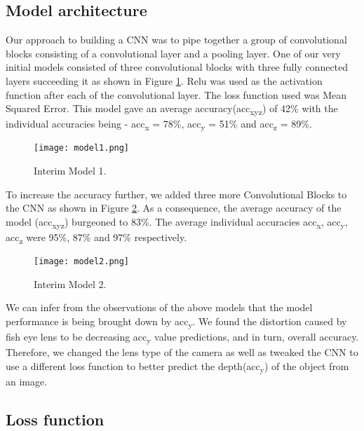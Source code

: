 \documentclass{article}
\begin{document}
\subsection{Model architecture}
Our approach to building a CNN was to pipe together a group of convolutional blocks consisting of a convolutional layer and a pooling layer. One of our very initial models consisted of three convolutional blocks with three fully connected layers succeeding it as shown in Figure \ref{fig:model1}. Relu was used as the activation function after each of the convolutional layer. The loss function used was Mean Squared Error. This model gave an average accuracy(acc\textsubscript{xyz}) of 42\% with the individual accuracies being - acc\textsubscript{x} = 78\%, acc\textsubscript{y} = 51\% and acc\textsubscript{z} = 89\%.

\begin{figure}[ht]
  \centering
  \texttt{[image: model1.png]}
  \caption{Interim Model 1.}
  \label{fig:model1}
\end{figure}

To increase the accuracy further, we added three more Convolutional Blocks to the CNN as shown in Figure \ref{fig:model2}. As a consequence, the average accuracy of the model (acc\textsubscript{xyz}) burgeoned to 83\%. The average individual accuracies acc\textsubscript{x}, acc\textsubscript{y}, acc\textsubscript{z} were 95\%, 87\% and 97\% respectively.

\begin{figure}[ht]
  \centering
  \texttt{[image: model2.png]}
  \caption{Interim Model 2.}
  \label{fig:model2}
\end{figure}

We can infer from the observations of the above models that the model performance is being brought down by acc\textsubscript{y}. We found the distortion caused by fish eye lens to be decreasing acc\textsubscript{y} value predictions, and in turn, overall accuracy. Therefore, we changed the lens type of the camera as well as tweaked the CNN to use a different loss function to better predict the depth(acc\textsubscript{y}) of the object from an image.

\subsection{Loss function}
\end{document}

